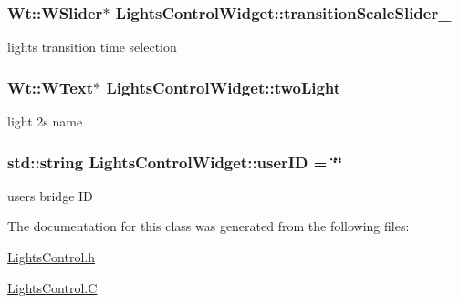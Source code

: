 \subsubsection[{\texorpdfstring{transition\+Scale\+Slider\+\_\+}{transitionScaleSlider_}}]{\setlength{\rightskip}{0pt plus 5cm}Wt\+::\+W\+Slider$\ast$ Lights\+Control\+Widget\+::transition\+Scale\+Slider\+\_\+\hspace{0.3cm}{\ttfamily [private]}}\hypertarget{classLightsControlWidget_af4bd66ddc5244ab9cf62dea9e5ffb1cf}{}\label{classLightsControlWidget_af4bd66ddc5244ab9cf62dea9e5ffb1cf}
light\textquotesingle{}s transition time selection 
\subsubsection[{\texorpdfstring{two\+Light\+\_\+}{twoLight_}}]{\setlength{\rightskip}{0pt plus 5cm}Wt\+::\+W\+Text$\ast$ Lights\+Control\+Widget\+::two\+Light\+\_\+\hspace{0.3cm}{\ttfamily [private]}}\hypertarget{classLightsControlWidget_a1148be7db38088bb15fc356e06e13b65}{}\label{classLightsControlWidget_a1148be7db38088bb15fc356e06e13b65}
light 2\textquotesingle{}s name 
\subsubsection[{\texorpdfstring{user\+ID}{userID}}]{\setlength{\rightskip}{0pt plus 5cm}std\+::string Lights\+Control\+Widget\+::user\+ID = \char`\"{}\char`\"{}\hspace{0.3cm}{\ttfamily [private]}}\hypertarget{classLightsControlWidget_aa26d4553e677dec57b64575a6d6d8558}{}\label{classLightsControlWidget_aa26d4553e677dec57b64575a6d6d8558}
user\textquotesingle{}s bridge ID 

The documentation for this class was generated from the following files\+:\begin{DoxyCompactItemize}
\item 
\hyperlink{LightsControl_8h}{Lights\+Control.\+h}\item 
\hyperlink{LightsControl_8C}{Lights\+Control.\+C}\end{DoxyCompactItemize}

